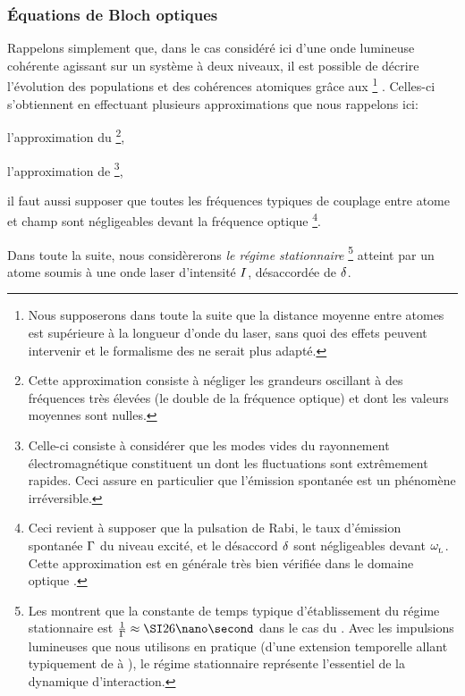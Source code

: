 \subsubsection{Équations de Bloch optiques}
Rappelons simplement que, dans le cas considéré ici d'une onde lumineuse cohérente agissant sur un système à deux niveaux, il est possible de décrire l'évolution des populations et des cohérences atomiques grâce aux \termetech{\EBO}%
\footnote{Nous supposerons dans toute la suite que la distance moyenne entre atomes est supérieure à la longueur d'onde du laser, sans quoi des effets  peuvent intervenir et le formalisme des \EBO ne serait plus adapté.}%
. Celles-ci s'obtiennent en effectuant plusieurs approximations que nous rappelons ici:
\begin{itemizel}
	\item l'approximation du 
	\footnote{Cette approximation consiste à négliger les grandeurs oscillant à des fréquences très élevées (le double de la fréquence optique) et dont les valeurs moyennes sont nulles.},
	\item l'approximation de 
	\footnote{Celle-ci consiste à considérer que les modes vides du rayonnement électromagnétique constituent un  dont les fluctuations sont extrêmement rapides. Ceci assure en particulier que l'émission spontanée est un phénomène irréversible.},
	\item il faut aussi supposer que toutes les fréquences typiques de couplage entre atome et champ sont négligeables devant la fréquence optique
	\footnote{Ceci revient à supposer que la pulsation de Rabi, le taux d'émission spontanée ${\Gamma}$ du niveau excité, et le désaccord  ${\delta}$ sont négligeables devant ${\omega_{_{\rm L}}}$. Cette approximation est en générale très bien vérifiée dans le domaine optique%
.}.
\end{itemizel}
%
Dans toute la suite, nous considèrerons \emph{le régime stationnaire}%
%
\footnote{Les \EBO montrent que la constante de temps typique d'établissement du régime stationnaire est $\tfrac{1}{\pulsSpont}\approx \nanos{26}$ dans le cas du \Rb. Avec les impulsions lumineuses que nous utilisons en pratique (d'une extension temporelle allant typiquement de  à ), le régime stationnaire représente l'essentiel de la dynamique d'interaction.}
%
 atteint par un atome soumis à une onde laser d'intensité ${I}$, désaccordée de ${\delta}$.  

